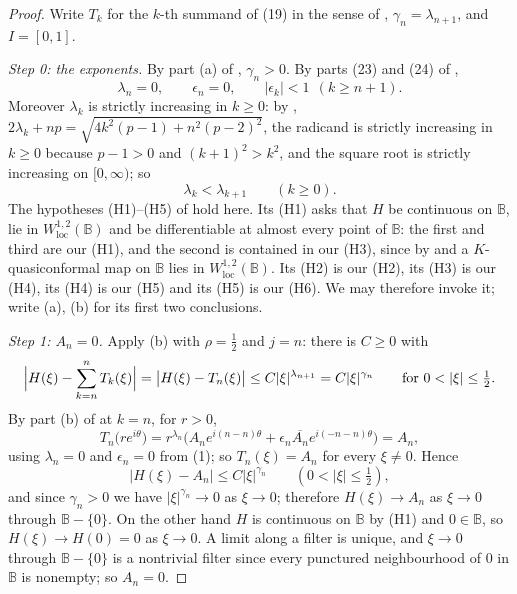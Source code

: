 \begin{proof}
Write $T_k$ for the $k$-th summand of (19) in the sense of ,
$\gamma_n=\lambda_{n+1}$, and $I=[0,1]$.

\emph{Step 0: the exponents.}  By part (a) of ,
$\gamma_n>0$.  By parts (23) and (24) of ,
\begin{equation}\tag{1}
  \lambda_n=0,\qquad\epsilon_n=0,\qquad|\epsilon_k|<1\ \ (k\ge n+1).
\end{equation}
Moreover $\lambda_k$ is strictly increasing in $k\ge0$: by
, $2\lambda_k+np=\sqrt{4k^2(p-1)+n^2(p-2)^2}$, the radicand
is strictly increasing in $k\ge0$ because $p-1>0$ and $(k+1)^2>k^2$, and the
square root is strictly increasing on $[0,\infty)$; so
\begin{equation}\tag{2}
  \lambda_k<\lambda_{k+1}\qquad(k\ge0).
\end{equation}
The hypotheses (H1)--(H5) of  hold here.  Its
(H1) asks that $H$ be continuous on $\mathbb{B}$, lie in
$W^{1,2}_{\mathrm{loc}}(\mathbb{B})$ and be differentiable at almost every
point of $\mathbb{B}$: the first and third are our (H1), and the second is
contained in our (H3), since by  and
 a $K$-quasiconformal map on $\mathbb{B}$ lies in
$W^{1,2}_{\mathrm{loc}}(\mathbb{B})$.  Its (H2) is our (H2), its (H3) is our
(H4), its (H4) is our (H5) and its (H5) is our (H6).  We may therefore invoke
it; write (a), (b) for its first two conclusions.

\emph{Step 1: $A_n=0$.}  Apply (b) with $\rho=\tfrac12$ and $j=n$: there is
$C\ge0$ with
\[
  \Bigl|H(\xi)-\sum_{k=n}^{n}T_k(\xi)\Bigr|=\bigl|H(\xi)-T_n(\xi)\bigr|
  \le C|\xi|^{\lambda_{n+1}}=C|\xi|^{\gamma_n}
  \qquad\text{for }0<|\xi|\le\tfrac12 .
\]
By part (b) of  at $k=n$, for $r>0$,
\[
  T_n\bigl(re^{i\theta}\bigr)
  =r^{\lambda_n}\bigl(A_ne^{i(n-n)\theta}
    +\epsilon_n\overline{A_n}e^{i(-n-n)\theta}\bigr)=A_n,
\]
using $\lambda_n=0$ and $\epsilon_n=0$ from (1); so $T_n(\xi)=A_n$ for every
$\xi\neq0$.  Hence
\[
  \bigl|H(\xi)-A_n\bigr|\le C|\xi|^{\gamma_n}\qquad(0<|\xi|\le\tfrac12),
\]
and since $\gamma_n>0$ we have $|\xi|^{\gamma_n}\to0$ as $\xi\to0$; therefore
$H(\xi)\to A_n$ as $\xi\to0$ through $\mathbb{B}-\{0\}$.  On the other hand $H$
is continuous on $\mathbb{B}$ by (H1) and $0\in\mathbb{B}$, so
$H(\xi)\to H(0)=0$ as $\xi\to0$.  A limit along a filter is unique, and
$\xi\to0$ through $\mathbb{B}-\{0\}$ is a nontrivial filter since every
punctured neighbourhood of $0$ in $\mathbb{B}$ is nonempty; so $A_n=0$.


\end{proof}
